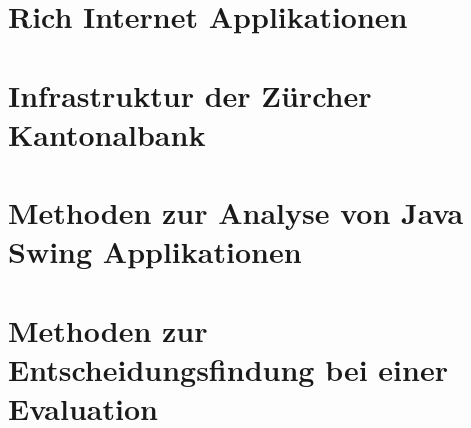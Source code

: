 \documentclass[
11pt, %
a4paper, %
BCOR25mm, %
DIV14, %
footsepline = false, %
headsepline, %
twoside, %
openright,
abstracton, %
listof=totocnumbered, %
bibliography=totocnumbered %
]{scrreprt}
\begin{document}
  

  \cleardoublepage
   
   
  \chapter{Rich Internet Applikationen}\label{chapter:RichInternetApplikationen}
  
  

  \cleardoublepage
  
   
  \chapter{Infrastruktur der Zürcher
  Kantonalbank}\label{chapter:InfrastrukturDerZuercherKantonalbank}

  

  \cleardoublepage
   
   
  \chapter{Methoden zur Analyse von Java Swing
  Applikationen}\label{chapter:MethodenZurAnalyseVonJavaSwingApplikationen}
  
  

  \cleardoublepage
  
   
  \chapter{Methoden zur Entscheidungsfindung bei einer
  Evaluation}\label{chapter:MethodenZurEntscheidungsfindungBeiEinerEvaluation}
  
\end{document}
